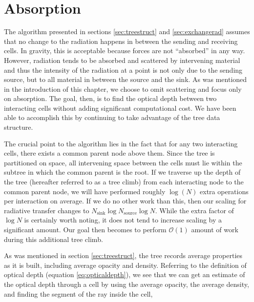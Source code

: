 
\section{Absorption}
\label{sec:absorption}

The algorithm presented in sections \ref{sec:treestruct} and \ref{sec:exchangerad} assumes that no change to the radiation happens in between the sending and receiving cells. In gravity, this is acceptable because forces are not ``absorbed'' in any way. However, radiation tends to be absorbed and scattered by intervening material and thus the intensity of the radiation at a point is not only due to the sending source, but to all material in between the source and the sink. As was mentioned in the introduction of this chapter, we choose to omit scattering and focus only on absorption. The goal, then, is to find the optical depth between two interacting cells without adding significant computational cost. We have been able to accomplish this by continuing to take advantage of the tree data structure.

The crucial point to the algorithm lies in the fact that for any two interacting cells, there exists a common parent node above them. Since the tree is partitioned on space, all intervening space between the cells must lie within the subtree in which the common parent is the root. If we traverse up the depth of the tree (hereafter referred to as a tree climb) from each interacting node to the common parent node, we will have performed roughly $\log(N)$ extra operations per interaction on average. If we do no other work than this, then our scaling for radiative transfer changes to $N_{\mbox{sink}}\log{N_{\mbox{source}}}\log{N}$. While the extra factor of $\log{N}$ is certainly worth noting, it does not tend to increase scaling by a significant amount. Our goal then becomes to perform $\mathcal{O}(1)$ amount of work during this additional tree climb.

As was mentioned in section \ref{sec:treestruct}, the tree records average properties as it is built, including average opacity and density. Referring to the definition of optical depth (equation \ref{eq:opticaldepth}), we see that we can get an estimate of the optical depth through a cell by using the average opacity, the average density, and finding the segment of the ray inside the cell,


